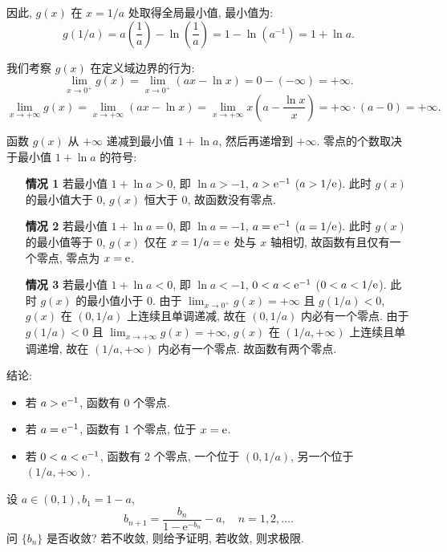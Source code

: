\begin{solution}
\begin{enumerate}
              因此, $g(x)$ 在 $x = 1/a$ 处取得全局最小值, 最小值为:
              $$ g(1/a) = a\left(\frac{1}{a}\right) - \ln\left(\frac{1}{a}\right) = 1 - \ln(a^{-1}) = 1 + \ln a. $$

              我们考察 $g(x)$ 在定义域边界的行为:
              $$ \lim_{x \to 0^+} g(x) = \lim_{x \to 0^+} (ax - \ln x) = 0 - (-\infty) = +\infty. $$
              $$ \lim_{x \to +\infty} g(x) = \lim_{x \to +\infty} (ax - \ln x) = \lim_{x \to +\infty} x \left(a - \frac{\ln x}{x}\right) = +\infty \cdot (a - 0) = +\infty. $$

              函数 $g(x)$ 从 $+\infty$ 递减到最小值 $1+\ln a$, 然后再递增到 $+\infty$. 零点的个数取决于最小值 $1+\ln a$ 的符号:

              \begin{enumerate}
                  \item[\textbf{情况 1}] 若最小值 $1 + \ln a > 0$, 即 $\ln a > -1$, $a > \mathrm{e}^{-1}$ ($a > 1/\mathrm{e}$).
                      此时 $g(x)$ 的最小值大于 0, $g(x)$ 恒大于 0, 故函数没有零点.

                  \item[\textbf{情况 2}] 若最小值 $1 + \ln a = 0$, 即 $\ln a = -1$, $a = \mathrm{e}^{-1}$ ($a = 1/\mathrm{e}$).
                      此时 $g(x)$ 的最小值等于 0, $g(x)$ 仅在 $x=1/a = \mathrm{e}$ 处与 $x$ 轴相切, 故函数有且仅有一个零点, 零点为 $x=\mathrm{e}$.

                  \item[\textbf{情况 3}] 若最小值 $1 + \ln a < 0$, 即 $\ln a < -1$, $0 < a < \mathrm{e}^{-1}$ ($0 < a < 1/\mathrm{e}$).
                      此时 $g(x)$ 的最小值小于 0.
                      由于 $\lim_{x \to 0^+} g(x) = +\infty$ 且 $g(1/a) < 0$, $g(x)$ 在 $(0, 1/a)$ 上连续且单调递减, 故在 $(0, 1/a)$ 内必有一个零点.
                      由于 $g(1/a) < 0$ 且 $\lim_{x \to +\infty} g(x) = +\infty$, $g(x)$ 在 $(1/a, +\infty)$ 上连续且单调递增, 故在 $(1/a, +\infty)$ 内必有一个零点.
                      故函数有两个零点.
              \end{enumerate}

              结论:
              \begin{itemize}
                  \item 若 $a > \mathrm{e}^{-1}$, 函数有 0 个零点.
                  \item 若 $a = \mathrm{e}^{-1}$, 函数有 1 个零点, 位于 $x = \mathrm{e}$.
                  \item 若 $0 < a < \mathrm{e}^{-1}$, 函数有 2 个零点, 一个位于 $(0, 1/a)$, 另一个位于 $(1/a, +\infty)$.
              \end{itemize}

    \end{enumerate}
\end{solution}

\begin{exercise}[3.3.25]
    设 $a \in (0,1), b_1=1-a$,
    $$ b_{n+1} = \frac{b_n}{1-\mathrm{e}^{-b_n}} - a, \quad n=1,2,\dots. $$
    问 $\{b_n\}$ 是否收敛? 若不收敛, 则给予证明, 若收敛, 则求极限.
\end{exercise}



\newpage
